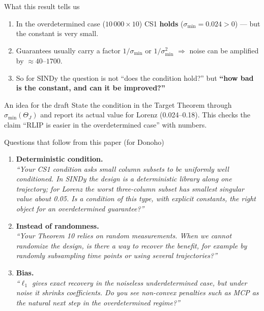 \documentclass[aspectratio=169,11pt]{beamer}
\begin{document}
\begin{frame}{What this result tells us}
  \begin{enumerate}
    \item In the overdetermined case ($10\,000\times10$) CS1 \textbf{holds} ($\sigma_{\min}=0.024>0$) --- but the constant is very small.
    \item Guarantees usually carry a factor $1/\sigma_{\min}$ or $1/\sigma_{\min}^2$ $\Rightarrow$ noise can be amplified by $\approx40$--$1700$.
    \item So for SINDy the question is not ``does the condition hold?'' but \textbf{``how bad is the constant, and can it be improved?''}
  \end{enumerate}
  \begin{alertblock}{An idea for the draft}
    State the condition in the Target Theorem through $\sigma_{\min}(\Theta_J)$ and report its actual value for Lorenz (0.024--0.18).
    This checks the claim ``RLIP is easier in the overdetermined case'' with numbers.
  \end{alertblock}
\end{frame}

\begin{frame}{Questions that follow from this paper (for Donoho)}
  \begin{enumerate}
    \item \textbf{Deterministic condition.} \\
      {\small\itshape ``Your CS1 condition asks small column subsets to be uniformly well conditioned. In SINDy the design is a deterministic
      library along one trajectory; for Lorenz the worst three-column subset has smallest singular value about 0.05. Is a condition of this type,
      with explicit constants, the right object for an overdetermined guarantee?''}
    \item \textbf{Instead of randomness.} \\
      {\small\itshape ``Your Theorem 10 relies on random measurements. When we cannot randomize the design, is there a way to recover the benefit,
      for example by randomly subsampling time points or using several trajectories?''}
    \item \textbf{Bias.} \\
      {\small\itshape ``$\ell_1$ gives exact recovery in the noiseless underdetermined case, but under noise it shrinks coefficients. Do you see non-convex
      penalties such as MCP as the natural next step in the overdetermined regime?''}
  \end{enumerate}
\end{frame}
\end{document}
